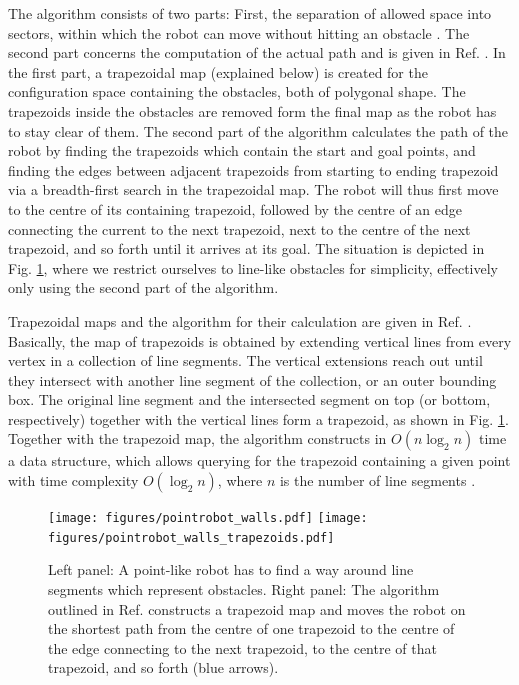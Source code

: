 The algorithm consists of two parts: First, the separation of allowed space into sectors, within which the robot can move 
without hitting an obstacle \cite[p. 286]{Berg2008}. 
The second part concerns the computation of the actual path and is given in Ref. \cite[p. 289]{Berg2008}. 
In the first part, a trapezoidal map (explained below) is created for the configuration space containing the obstacles, 
both of polygonal shape. The trapezoids inside the obstacles are removed form the final map as the robot has to stay clear 
of them. The second part of the algorithm calculates the path of the robot by finding the trapezoids which contain the start 
and goal points, and finding the edges between adjacent trapezoids from starting to ending trapezoid via a breadth-first search in the 
trapezoidal map. The robot will thus first move to the centre of its containing trapezoid, followed by the centre of an edge connecting 
the current to the next trapezoid, next to the centre of the next trapezoid, and so forth until it arrives at its goal. 
The situation is depicted in Fig. \ref{fig:robot_trapezoids}, where we restrict ourselves to line-like obstacles for simplicity, effectively
only using the second part of the algorithm.

Trapezoidal maps and the algorithm for their calculation are given in Ref. \cite[Ch. 6, pp. 121-146]{Berg2008}. Basically, the map of
trapezoids is obtained by extending vertical lines from every vertex in a collection of line segments. The vertical
extensions reach out until they intersect with another line segment of the collection, or an outer bounding box. The original line 
segment and the intersected segment on top (or bottom, respectively) together with the vertical lines form a trapezoid, as shown in 
Fig. \ref{fig:robot_trapezoids}. Together with the trapezoid map, the algorithm constructs in $O \left(n \log_{2} n \right)$ time a data 
structure, which allows querying for the trapezoid containing a given point with time complexity $O \left( \log_{2} n \right)$, 
where $n$ is the number of line segments \cite[Theorem 6.3, p. 133]{Berg2008}.

\begin{figure}[htb]
	\centering
	\texttt{[image: figures/pointrobot\_walls.pdf]}
	\hspace{1 cm}
	\texttt{[image: figures/pointrobot\_walls\_trapezoids.pdf]}
	\caption{Left panel: A point-like robot has to find a way around line segments which represent obstacles. Right panel: 
		The algorithm outlined in Ref. \cite[p. 289]{Berg2008} constructs a trapezoid map and moves the robot on the
		shortest path from the centre of one trapezoid to the centre of the edge connecting to the next trapezoid, to the
		centre of that trapezoid, and so forth (blue arrows).}
	\label{fig:robot_trapezoids}
\end{figure}

